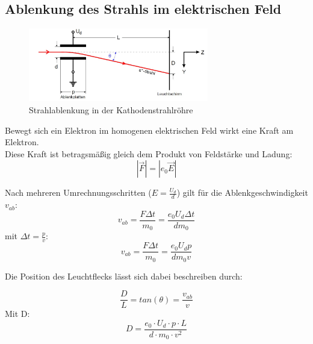 \subsection{Ablenkung des Strahls im elektrischen Feld}
\begin{figure}[h]
  \centering
  \includegraphics[width=0.7\textwidth]{Grafiken/V501(2)_Abb1.jpg}
  \caption{Strahlablenkung in der Kathodenstrahlröhre \cite{V501}}
\end{figure}
Bewegt sich ein Elektron im homogenen elektrischen Feld wirkt eine Kraft am Elektron. \\
Diese Kraft ist betragsmäßig gleich dem Produkt von Feldstärke und
Ladung:
\begin{equation}
  \label{eq:force}
  |\vec{F}| = |e_0\vec{E}|
\end{equation}

Nach mehreren Umrechnungsschritten ($E = \frac{U_d}{d}$) gilt für die Ablenkgeschwindigkeit $v_{ab}$:
\begin{equation}
  v_{ab} = \frac{F\Delta t}{m_0} = \frac{e_0 U_d\Delta t}{d m_0}
\end{equation}
mit $\Delta t =\frac{p}{v}$:
\begin{equation}
	v_{ab} = \frac{F\Delta t}{m_0} = \frac{e_0 U_d p}{d m_0 v}
\end{equation}

Die Position des Leuchtflecks lässt sich dabei beschreiben durch:

\begin{equation}
	\frac{D}{L} = tan(\theta) =  \frac{v_{ab}}{v}
\end{equation}
Mit D:
\begin{equation}
	\label{eq:Theorie_D}
	D = \frac{e_0\cdot U_d\cdot p\cdot L}{d\cdot m_0\cdot v^2}
\end{equation}


